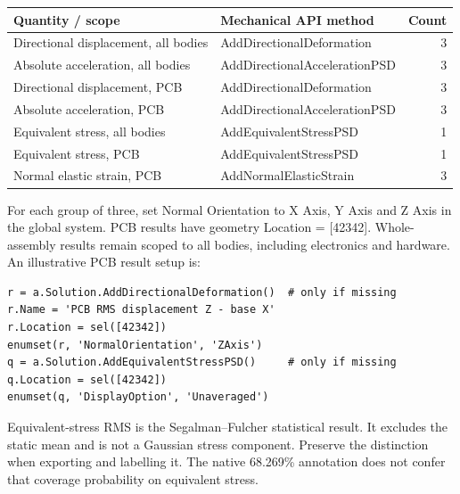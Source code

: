\documentclass[10pt,a4paper]{article}
\begin{document}
\begin{center}\small\begin{tabular}{p{48mm}p{67mm}r}\toprule
Quantity / scope & Mechanical API method & Count\\\midrule
Directional displacement, all bodies & AddDirectionalDeformation & 3\\
Absolute acceleration, all bodies & AddDirectionalAccelerationPSD & 3\\
Directional displacement, PCB & AddDirectionalDeformation & 3\\
Absolute acceleration, PCB & AddDirectionalAccelerationPSD & 3\\
Equivalent stress, all bodies & AddEquivalentStressPSD & 1\\
Equivalent stress, PCB & AddEquivalentStressPSD & 1\\
Normal elastic strain, PCB & AddNormalElasticStrain & 3\\\bottomrule\end{tabular}\end{center}
For each group of three, set Normal Orientation to X Axis, Y Axis and Z Axis in the global system. PCB results have geometry Location = [42342]. Whole-assembly results remain scoped to all bodies, including electronics and hardware. An illustrative PCB result setup is:

\begin{lstlisting}
r = a.Solution.AddDirectionalDeformation()  # only if missing
r.Name = 'PCB RMS displacement Z - base X'
r.Location = sel([42342])
enumset(r, 'NormalOrientation', 'ZAxis')
q = a.Solution.AddEquivalentStressPSD()     # only if missing
q.Location = sel([42342])
enumset(q, 'DisplayOption', 'Unaveraged')
\end{lstlisting}

Equivalent-stress RMS is the Segalman--Fulcher statistical result. It excludes the static mean and is not a Gaussian stress component. Preserve the distinction when exporting and labelling it. The native 68.269\% annotation does not confer that coverage probability on equivalent stress.
\end{document}

